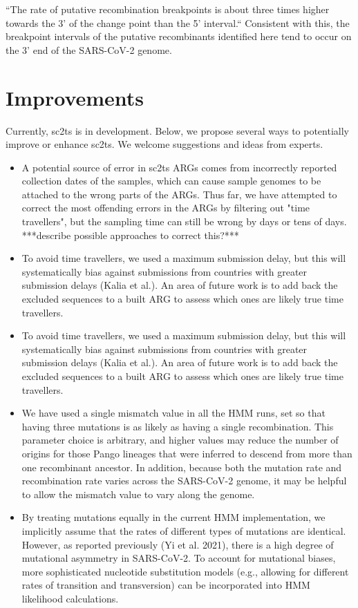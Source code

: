 \documentclass{article}
\begin{document}
“The rate of putative recombination breakpoints is about three times higher towards the 3' of the change point than the 5' interval.“ Consistent with this, the breakpoint intervals of the putative recombinants identified here tend to occur on the 3’ end of the SARS-CoV-2 genome.

\section{Improvements}

Currently, sc2ts is in development. Below, we propose several ways to potentially improve or enhance sc2ts. We welcome suggestions and ideas from experts.

\begin{itemize}
\item A potential source of error in sc2ts ARGs comes from incorrectly reported collection dates of the samples, which can cause sample genomes to be attached to the wrong parts of the ARGs. Thus far, we have attempted to correct the most offending errors in the ARGs by filtering out "time travellers", but the sampling time can still be wrong by days or tens of days. ***describe possible approaches to correct this?***
\item To avoid time travellers, we used a maximum submission delay, but this will systematically bias against submissions from countries with greater submission delays (Kalia et al.). An area of future work is to add back the excluded sequences to a built ARG to assess which ones are likely true time travellers.
\item To avoid time travellers, we used a maximum submission delay, but this will systematically bias against submissions from countries with greater submission delays (Kalia et al.). An area of future work is to add back the excluded sequences to a built ARG to assess which ones are likely true time travellers.
\item We have used a single mismatch value in all the HMM runs, set so that having three mutations is as likely as having a single recombination. This parameter choice is arbitrary, and higher values may reduce the number of origins for those Pango lineages that were inferred to descend from more than one recombinant ancestor. In addition, because both the mutation rate and recombination rate varies across the SARS-CoV-2 genome, it may be helpful to allow the mismatch value to vary along the genome.
\item By treating mutations equally in the current HMM implementation, we implicitly assume that the rates of different types of mutations are identical. However, as reported previously (Yi et al. 2021), there is a high degree of mutational asymmetry in SARS-CoV-2. To account for mutational biases, more sophisticated nucleotide substitution models (e.g., allowing for different rates of transition and transversion) can be incorporated into HMM likelihood calculations.

\end{itemize}
\end{document}
